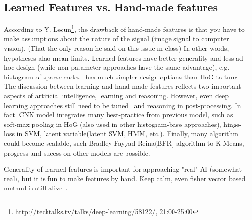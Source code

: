 \documentclass[12pt]{article}
\begin{document}
\subsection{Learned Features vs. Hand-made features}
According to Y. Lecun\footnote{http://techtalks.tv/talks/deep-learning/58122/, 21:00-25:00}, the drawback of hand-made features is that you have to make assumptions about the nature of the signal (image signal to computer vision). (That the only reason he said on this issue in class) In other words, hypotheses alao mean limits. Learned features have better generality and less ad-hoc design (while non-parameter approaches have the same advantage), e.g. histogram of sparse codes~\citep{ren2013histograms} has much simpler design options than HoG to tune. The discussion between learning and hand-made features reflects two important aspects of artificial intelligence, learning and reasoning. However, even deep learning approaches still need to be tuned~\citep{finetune14berkeley} and reasoning in post-processing. In fact, CNN model integrates many best-practice from previous model, such as soft-max pooling in HoG (also used in other histogram-base approaches), hinge-loss in SVM, latent variable(latent SVM, HMM, etc.). Finally, many algorithm could become scalable, such Bradley-Fayyad-Reina(BFR) algorithm to K-Means, progress and sucess on other models are possible.

Generality of learned features is important for approaching "real" AI (somewhat real), but it is fun to make features by hand. Keep calm, even fisher vector based method is still alive~\citep{ILSVRC}.


%

\end{document}
